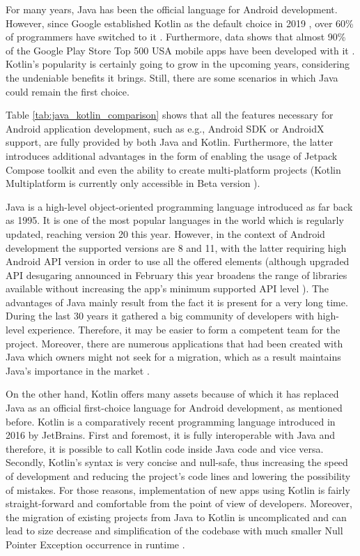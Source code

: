 For many years, Java has been the official language for Android development. However, since Google established Kotlin as the default choice in 2019 \cite{android_kotlin_first}, over 60\% of programmers have switched to it \cite{android_kotlin}. Furthermore, data shows that almost 90\% of the Google Play Store Top 500 USA mobile apps have been developed with it \cite{kc_kotlin_vs_java}. Kotlin's popularity is certainly going to grow in the upcoming years, considering the undeniable benefits it brings. Still, there are some scenarios in which Java could remain the first choice.

Table \ref{tab:java_kotlin_comparison} shows that all the features necessary for Android application development, such as e.g., Android SDK or AndroidX support, are fully provided by both Java and Kotlin. Furthermore, the latter introduces additional advantages in the form of enabling the usage of Jetpack Compose toolkit and even the ability to create multi-platform projects (Kotlin Multiplatform is currently only accessible in Beta version \cite{kotlin_multiplatform}).

Java is a high-level object-oriented programming language introduced as far back as 1995. It is one of the most popular languages in the world which is regularly updated, reaching version 20 this year. However, in the context of Android development the supported versions are 8 and 11, with the latter requiring high Android API version in order to use all the offered elements (although upgraded API desugaring announced in February this year broadens the range of libraries available without increasing the app's minimum supported API level \cite{android_api_desugaring}). The advantages of Java mainly result from the fact it is present for a very long time. During the last 30 years it gathered a big community of developers with high-level experience. Therefore, it may be easier to form a competent team for the project. Moreover, there are numerous applications that had been created with Java which owners might not seek for a migration, which as a result maintains Java's importance in the market \cite{kc_kotlin_vs_java}.

On the other hand, Kotlin offers many assets because of which it has replaced Java as an official first-choice language for Android development, as mentioned before. Kotlin is a comparatively recent programming language introduced in 2016 by JetBrains. First and foremost, it is fully interoperable with Java and therefore, it is possible to call Kotlin code inside Java code and vice versa. Secondly, Kotlin's syntax is very concise and null-safe, thus increasing the speed of development and reducing the project's code lines and lowering the possibility of mistakes. For those reasons, implementation of new apps using Kotlin is fairly straight-forward and comfortable from the point of view of developers. Moreover, the migration of existing projects from Java to Kotlin is uncomplicated and can lead to size decrease and simplification of the codebase with much smaller Null Pointer Exception occurrence in runtime \cite{android_kotlin_first}.

